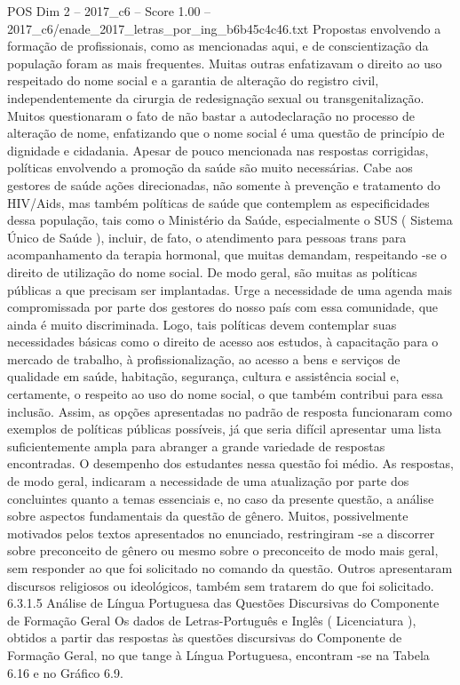 \begin{textsample}{POS Dim 2 – 2017\_c6 – Score 1.00 – 2017\_c6/enade\_2017\_letras\_por\_ing\_b6b45c4c46.txt}
Propostas envolvendo a formação de profissionais, como as mencionadas aqui, e de conscientização da população foram as mais frequentes.
Muitas outras enfatizavam o direito ao uso respeitado do nome social e a garantia de alteração do registro civil, independentemente da cirurgia de redesignação sexual ou transgenitalização.
Muitos questionaram o fato de não bastar a autodeclaração no processo de alteração de nome, enfatizando que o nome social é uma questão de princípio de dignidade e cidadania.
Apesar de pouco mencionada nas respostas corrigidas, políticas envolvendo a promoção da saúde são muito necessárias.
Cabe aos gestores de saúde ações direcionadas, não somente à prevenção e tratamento do HIV/Aids, mas também políticas de saúde que contemplem as especificidades dessa população, tais como o Ministério da Saúde, especialmente o SUS ( Sistema Único de Saúde ), incluir, de fato, o atendimento para pessoas trans para acompanhamento da terapia hormonal, que muitas demandam, respeitando -se o direito de utilização do nome social.
De modo geral, são muitas as políticas públicas a que precisam ser implantadas.
Urge a necessidade de uma agenda mais compromissada por parte dos gestores do nosso país com essa comunidade, que ainda é muito discriminada.
Logo, tais políticas devem contemplar suas necessidades básicas como o direito de acesso aos estudos, à capacitação para o mercado de trabalho, à profissionalização, ao acesso a bens e serviços de qualidade em saúde, habitação, segurança, cultura e assistência social e, certamente, o respeito ao uso do nome social, o que também contribui para essa inclusão.
Assim, as opções apresentadas no padrão de resposta funcionaram como exemplos de políticas públicas possíveis, já que seria difícil apresentar uma lista suficientemente ampla para abranger a grande variedade de respostas encontradas.
O desempenho dos estudantes nessa questão foi médio.
As respostas, de modo geral, indicaram a necessidade de uma atualização por parte dos concluintes quanto a temas essenciais e, no caso da presente questão, a análise sobre aspectos fundamentais da questão de gênero.
Muitos, possivelmente motivados pelos textos apresentados no enunciado, restringiram -se a discorrer sobre preconceito de gênero ou mesmo sobre o preconceito de modo mais geral, sem responder ao que foi solicitado no comando da questão.
Outros apresentaram discursos religiosos ou ideológicos, também sem tratarem do que foi solicitado. 6.3.1.5 Análise de Língua Portuguesa das Questões Discursivas do Componente de Formação Geral Os dados de Letras-Português e Inglês ( Licenciatura ), obtidos a partir das respostas às questões discursivas do Componente de Formação Geral, no que tange à Língua Portuguesa, encontram -se na Tabela 6.16 e no Gráfico 6.9.

\end{textsample}
